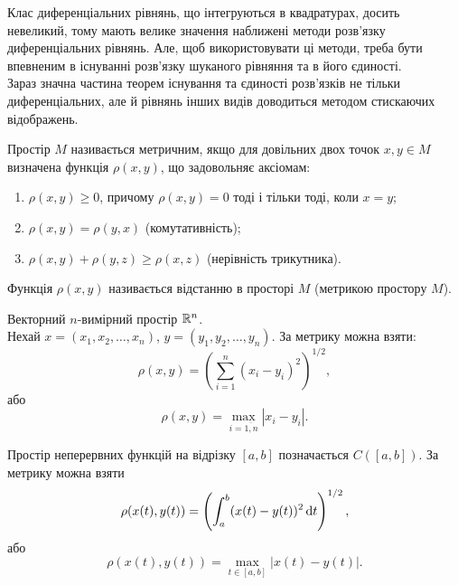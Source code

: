 Клас диференціальних рівнянь, що інтегруються в квадратурах, досить невеликий, тому мають велике значення наближені методи розв’язку диференціальних рівнянь. Але, щоб використовувати ці методи, треба бути впевненим в існуванні розв’язку шуканого рівняння та в його єдиності. \\

Зараз значна частина теорем існування  та єдиності розв’язків не тільки диференціальних, але й рівнянь інших видів доводиться методом стискаючих відображень. \\

\begin{definition} 
	Простір $M$ називається метричним, якщо для довільних двох точок $x,y\in M$ визначена функція $\rho(x,y)$, що задовольняє аксіомам:
	\begin{enumerate}
		\item $\rho(x, y)\ge0$, причому $\rho(x,y)=0$ тоді і тільки тоді, коли $x=y$;
		\item $\rho(x,y)=\rho(y,x)$ (комутативність);
		\item $\rho(x,y)+\rho(y,z)\ge\rho(x,z)$ (нерівність трикутника).
	\end{enumerate}
	Функція $\rho(x,y)$ називається відстанню в просторі $M$ (метрикою простору $M$).
\end{definition}
\begin{example} 
	Векторний $n$-вимірний простір $\mathbb{R}^n$. \\

	Нехай $x=(x_1,x_2,\ldots,x_n)$, $y=(y_1,y_2,\ldots,y_n)$. За метрику можна взяти: 
	\begin{equation}
		\label{eq:1.6.1}
		\rho(x,y)=\left(\sum_{i=1}^n (x_i-y_i)^2\right)^{1/2},
	\end{equation}
	або 
	\begin{equation}
		\label{eq:1.6.2}
		\rho(x,y)=\max_{i=\overline{1,n}}|x_i-y_i|.
	\end{equation}
\end{example}
\begin{example} 
	Простір неперервних функцій на відрізку $[a,b]$ позначається $C([a,b])$. За метрику можна взяти 
	\begin{equation}
		\label{eq:1.6.3}
		\rho(x(t), y(t)) = \left(\int_a^b (x(t)-y(t))^2 \mathop{}\!\mathrm{d} t\right)^{1/2},
	\end{equation}
	або
	\begin{equation}
		\label{eq:1.6.4}
		\rho(x(t), y(t)) = \max_{t\in[a,b]} |x(t)-y(t)|.
	\end{equation}
\end{example}
